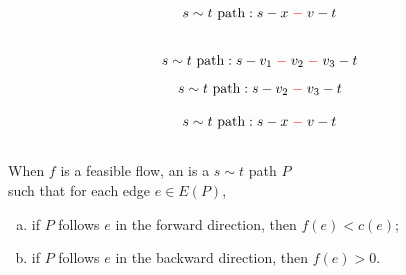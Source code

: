 \begin{frame}{}
  \begin{columns}
  \end{columns}

  \pause
  \vspace{0.80cm}
  \[
    s \sim t \text{ path}: s - x \;\textcolor{red}{-}\; v - t
  \]
\end{frame}

\begin{frame}{}
  \begin{columns}
      \pause
  \end{columns}

  \pause
  \vspace{0.80cm}
  \[
    s \sim t \text{ path}: s - v_{1} \;\textcolor{red}{-}\;
      v_{2}\;\textcolor{red}{-}\; v_{3} - t
  \]
  \pause
  \[
    s \sim t \text{ path}: s - v_{2} \;\textcolor{red}{-}\; v_{3} - t
  \]
\end{frame}

\begin{frame}{}
  \[
    s \sim t \text{ path}: s - x \;\textcolor{red}{-}\; v - t
  \]
  \vspace{-0.30cm}
  \begin{columns}
  \end{columns}

  \pause
  \vspace{0.30cm}
  \begin{definition}
    When $f$ is a feasible flow, an  is a $s \sim t$ path $P$ \\
     such that for each edge $e \in E(P)$,
    \begin{enumerate}[(a)]
      \item if $P$ follows $e$ in the forward direction, then $f(e) < c(e)$;
      \item if $P$ follows $e$ in the backward direction, then $f(e) > 0$.
    \end{enumerate}
  \end{definition}
\end{frame}

